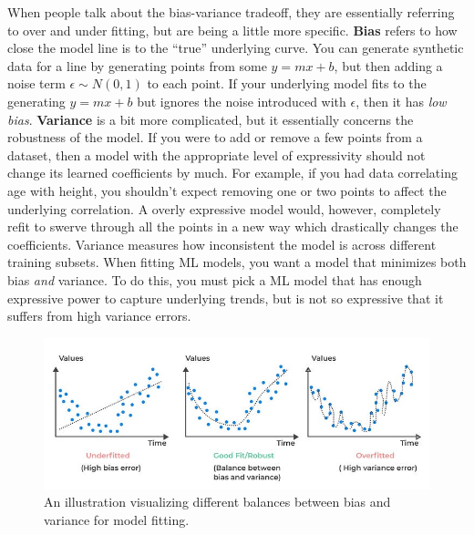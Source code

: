     When people talk about the bias-variance tradeoff, they are essentially referring to over and under fitting, but are being a little more specific. \textbf{Bias} refers to how close the model line is to the ``true'' underlying curve. You can generate synthetic data for a line by generating points from some $y = mx +b$, but then adding a noise term $\epsilon \sim N(0, 1)$ to each point. If your underlying model fits to the generating $y = mx+b$ but ignores the noise introduced with $\epsilon$, then it has \textit{low bias}. \textbf{Variance} is a bit more complicated, but it essentially concerns the robustness of the model. If you were to add or remove a few points from a dataset, then a model with the appropriate level of expressivity should not change its learned coefficients by much. For example, if you had data correlating age with height, you shouldn't expect removing one or two points to affect the underlying correlation. A overly expressive model would, however, completely refit to swerve through all the points in a new way which drastically changes the coefficients. Variance measures how inconsistent the model is across different training subsets. When fitting ML models, you want a model that minimizes both bias \textit{and} variance. To do this, you must pick a ML model that has enough expressive power to capture underlying trends, but is not so expressive that it suffers from high variance errors. 

    \begin{figure}[H]
        \centering
        \includegraphics[width=0.8\linewidth]{ml/biasvariance.jpg}
        \caption{An illustration visualizing different balances between bias and variance for model fitting.}
        \label{fig:biasvariance}
    \end{figure}

